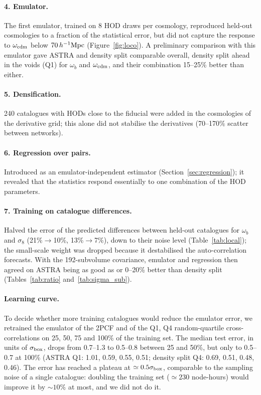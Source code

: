 \paragraph{4. Emulator.} The first emulator, trained on 8 HOD draws per cosmology, reproduced held-out cosmologies to a fraction of the statistical error, but did not capture the response to $\omega_{\rm cdm}$ below $70\,h^{-1}\mathrm{Mpc}$ (Figure~\ref{fig:loco}). A preliminary comparison with this emulator gave ASTRA and density split comparable overall, density split ahead in the voids (Q1) for $\omega_b$ and $\omega_{\rm cdm}$, and their combination 15--25\% better than either.

\paragraph{5. Densification.} 240 catalogues with HODs close to the fiducial were added in the cosmologies of the derivative grid; this alone did not stabilise the derivatives (70--170\% scatter between networks).

\paragraph{6. Regression over pairs.} Introduced as an emulator-independent estimator (Section~\ref{sec:regression}); it revealed that the statistics respond essentially to one combination of the HOD parameters.

\paragraph{7. Training on catalogue differences.} Halved the error of the predicted differences between held-out catalogues for $\omega_b$ and $\sigma_8$ (21\%$\to$10\%, 13\%$\to$7\%), down to their noise level (Table~\ref{tab:local}); the small-scale weight was dropped because it destabilised the auto-correlation forecasts. With the 192-subvolume covariance, emulator and regression then agreed on ASTRA being as good as or 0--20\% better than density split (Tables~\ref{tab:ratio} and~\ref{tab:sigma_sub}).

\paragraph{Learning curve.} To decide whether more training catalogues would reduce the emulator error, we retrained the emulator of the 2PCF and of the Q1, Q4 random-quartile cross-correlations on 25, 50, 75 and 100\% of the training set. The median test error, in units of $\sigma_{\rm box}$, drops from 0.7--1.3 to 0.5--0.8 between 25 and 50\%, but only to 0.5--0.7 at 100\% (ASTRA Q1: 1.01, 0.59, 0.55, 0.51; density split Q4: 0.69, 0.51, 0.48, 0.46). The error has reached a plateau at $\simeq0.5\sigma_{\rm box}$, comparable to the sampling noise of a single catalogue: doubling the training set ($\simeq230$ node-hours) would improve it by $\sim10\%$ at most, and we did not do it.

